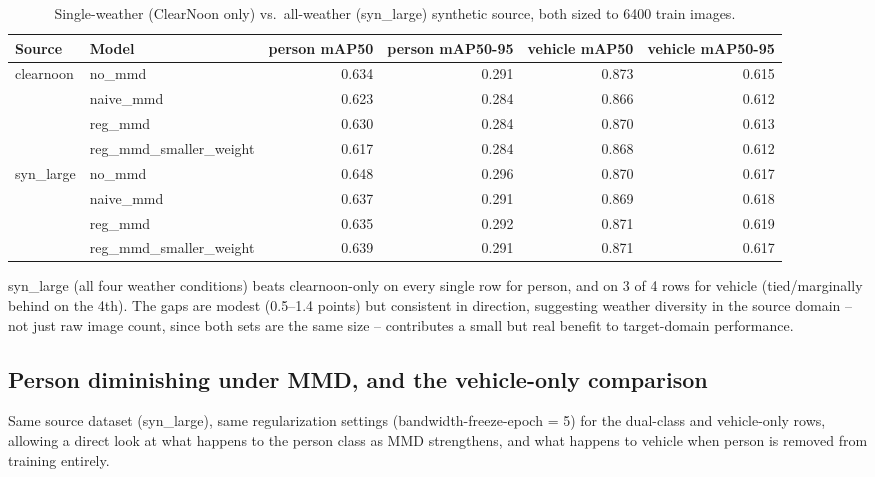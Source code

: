 \documentclass[11pt]{article}
\begin{document}
\begin{table}[h!]
    \centering
    \setlength{\tabcolsep}{4pt}
    \small
    \begin{tabular}{llrrrr}
        \toprule
        Source & Model & person mAP50 & person mAP50-95 & vehicle mAP50 & vehicle mAP50-95 \\
        \midrule
        \multirow{4}{*}{clearnoon} & no\_mmd & 0.634 & 0.291 & 0.873 & 0.615 \\
        & naive\_mmd & 0.623 & 0.284 & 0.866 & 0.612 \\
        & reg\_mmd & 0.630 & 0.284 & 0.870 & 0.613 \\
        & reg\_mmd\_smaller\_weight & 0.617 & 0.284 & 0.868 & 0.612 \\
        \midrule
        \multirow{4}{*}{syn\_large} & no\_mmd & 0.648 & 0.296 & 0.870 & 0.617 \\
        & naive\_mmd & 0.637 & 0.291 & 0.869 & 0.618 \\
        & reg\_mmd & 0.635 & 0.292 & 0.871 & 0.619 \\
        & reg\_mmd\_smaller\_weight & 0.639 & 0.291 & 0.871 & 0.617 \\
        \bottomrule
    \end{tabular}
    \caption{Single-weather (ClearNoon only) vs.\ all-weather (syn\_large) synthetic
    source, both sized to 6400 train images.}
\end{table}

\noindent syn\_large (all four weather conditions) beats clearnoon-only on every single
row for person, and on 3 of 4 rows for vehicle (tied/marginally behind on the 4th).
The gaps are modest (0.5--1.4 points) but consistent in direction, suggesting weather
diversity in the source domain -- not just raw image count, since both sets are the
same size -- contributes a small but real benefit to target-domain performance.

\subsection{Person diminishing under MMD, and the vehicle-only comparison}

Same source dataset (syn\_large), same regularization settings (bandwidth-freeze-epoch
= 5) for the dual-class and vehicle-only rows, allowing a direct look at what happens
to the person class as MMD strengthens, and what happens to vehicle when person is
removed from training entirely.
\end{document}

